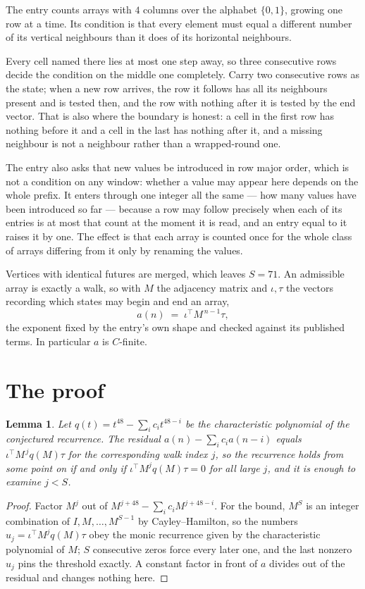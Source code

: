 \documentclass[11pt,a4paper]{article}
\theoremstyle{plain}
\newtheorem{lemma}[theorem]{Lemma}
\theoremstyle{definition}
\begin{document}
The entry counts arrays with $4$ columns over the alphabet $\{0,1\}$, growing one row at a time. Its condition is that every element must equal a different number of its vertical neighbours than it does of its horizontal neighbours.

Every cell named there lies at most one step away, so three consecutive rows decide the condition on the middle one completely. Carry two consecutive rows as the state; when a new row arrives, the row it follows has all its neighbours present and is tested then, and the row with nothing after it is tested by the end vector. That is also where the boundary is honest: a cell in the first row has nothing before it and a cell in the last has nothing after it, and a missing neighbour is not a neighbour rather than a wrapped-round one.

The entry also asks that new values be introduced in row major order, which is not a condition on any window: whether a value may appear here depends on the whole prefix. It enters through one integer all the same --- how many values have been introduced so far --- because a row may follow precisely when each of its entries is at most that count at the moment it is read, and an entry equal to it raises it by one. The effect is that each array is counted once for the whole class of arrays differing from it only by renaming the values.

Vertices with identical futures are merged, which leaves $S=71$. An admissible array is exactly a walk, so with $M$ the adjacency matrix and $\iota,\tau$ the vectors recording which states may begin and end an array,
\[
a(n)\;=\;\iota^{\!\top}M^{\,n-1}\tau ,
\]
the exponent fixed by the entry's own shape and checked against its published terms. In
particular $a$ is $C$-finite.

\section{The proof}

\begin{lemma}\label{lem:crit}
Let $q(t)=t^{48}-\sum_i c_it^{48-i}$ be the characteristic polynomial of the
conjectured recurrence. The residual $a(n)-\sum_ic_ia(n-i)$ equals
$\iota^{\!\top}M^{\,j}q(M)\tau$ for the corresponding walk index $j$, so the recurrence
holds from some point on if and only if $\iota^{\!\top}M^{j}q(M)\tau=0$ for all large $j$,
and it is enough to examine $j<S$.
\end{lemma}

\begin{proof}
Factor $M^{j}$ out of $M^{j+48}-\sum_ic_iM^{j+48-i}$. For the bound, $M^{S}$
is an integer combination of $I,M,\dots,M^{S-1}$ by Cayley--Hamilton, so the numbers
$u_j=\iota^{\!\top}M^{j}q(M)\tau$ obey the monic recurrence given by the characteristic
polynomial of $M$; $S$ consecutive zeros force every later one, and the last nonzero $u_j$
pins the threshold exactly. A constant factor in front of $a$ divides out of the residual and
changes nothing here.
\end{proof}
\end{document}
